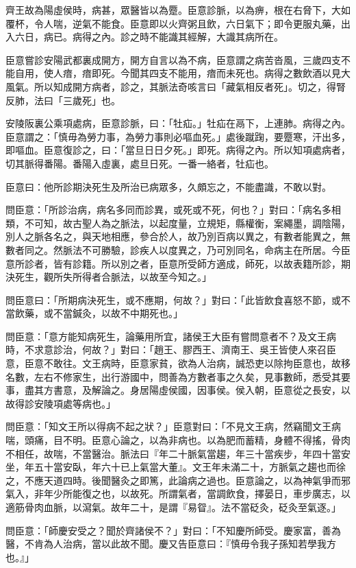 \begin{pinyinscope}
齊王故為陽虛侯時，病甚，眾醫皆以為蹷。臣意診脈，以為痹，根在右脅下，大如覆杯，令人喘，逆氣不能食。臣意即以火齊粥且飲，六日氣下；即令更服丸藥，出入六日，病已。病得之內。診之時不能識其經解，大識其病所在。

臣意嘗診安陽武都裏成開方，開方自言以為不病，臣意謂之病苦沓風，三歲四支不能自用，使人瘖，瘖即死。今聞其四支不能用，瘖而未死也。病得之數飲酒以見大風氣。所以知成開方病者，診之，其脈法奇咳言曰「藏氣相反者死」。切之，得腎反肺，法曰「三歲死」也。

安陵阪裏公乘項處病，臣意診脈，曰：「牡疝。」牡疝在鬲下，上連肺。病得之內。臣意謂之：「慎毋為勞力事，為勞力事則必嘔血死。」處後蹴踘，要蹷寒，汗出多，即嘔血。臣意復診之，曰：「當旦日日夕死。」即死。病得之內。所以知項處病者，切其脈得番陽。番陽入虛裏，處旦日死。一番一絡者，牡疝也。

臣意曰：他所診期決死生及所治已病眾多，久頗忘之，不能盡識，不敢以對。

問臣意：「所診治病，病名多同而診異，或死或不死，何也？」對曰：「病名多相類，不可知，故古聖人為之脈法，以起度量，立規矩，縣權衡，案繩墨，調陰陽，別人之脈各名之，與天地相應，參合於人，故乃別百病以異之，有數者能異之，無數者同之。然脈法不可勝驗，診疾人以度異之，乃可別同名，命病主在所居。今臣意所診者，皆有診籍。所以別之者，臣意所受師方適成，師死，以故表籍所診，期決死生，觀所失所得者合脈法，以故至今知之。」

問臣意曰：「所期病決死生，或不應期，何故？」對曰：「此皆飲食喜怒不節，或不當飲藥，或不當鍼灸，以故不中期死也。」

問臣意：「意方能知病死生，論藥用所宜，諸侯王大臣有嘗問意者不？及文王病時，不求意診治，何故？」對曰：「趙王、膠西王、濟南王、吳王皆使人來召臣意，臣意不敢往。文王病時，臣意家貧，欲為人治病，誠恐吏以除拘臣意也，故移名數，左右不修家生，出行游國中，問善為方數者事之久矣，見事數師，悉受其要事，盡其方書意，及解論之。身居陽虛侯國，因事侯。侯入朝，臣意從之長安，以故得診安陵項處等病也。」

問臣意：「知文王所以得病不起之狀？」臣意對曰：「不見文王病，然竊聞文王病喘，頭痛，目不明。臣意心論之，以為非病也。以為肥而蓄精，身體不得搖，骨肉不相任，故喘，不當醫治。脈法曰『年二十脈氣當趨，年三十當疾步，年四十當安坐，年五十當安臥，年六十已上氣當大董』。文王年未滿二十，方脈氣之趨也而徐之，不應天道四時。後聞醫灸之即篤，此論病之過也。臣意論之，以為神氣爭而邪氣入，非年少所能復之也，以故死。所謂氣者，當調飲食，擇晏日，車步廣志，以適筋骨肉血脈，以瀉氣。故年二十，是謂『易眢』。法不當砭灸，砭灸至氣逐。」

問臣意：「師慶安受之？聞於齊諸侯不？」對曰：「不知慶所師受。慶家富，善為醫，不肯為人治病，當以此故不聞。慶又告臣意曰：『慎毋令我子孫知若學我方也。』」


\end{pinyinscope}
